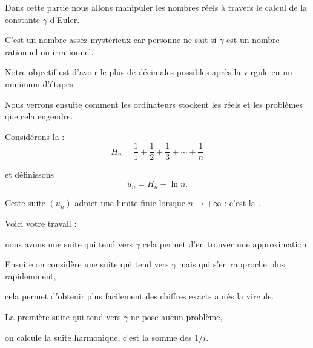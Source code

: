 


\newcommand{\codeinline}[1]{\texttt{#1}}






\debuttexte

\diapo

\change

\change


Dans cette partie nous allons manipuler les nombres réels à travers le calcul de la constante $\gamma$ d'Euler.


C'est un nombre assez mystérieux car personne ne sait si $\gamma$ est un nombre rationnel ou irrationnel.

\change

Notre objectif est d'avoir le plus de décimales possibles après la virgule en un minimum d'étapes.

\change

Nous verrons ensuite comment les ordinateurs stockent les réels et les problèmes que cela engendre.


\diapo

Considérons la  :
$$H_n = \frac{1}{1}+\frac{1}{2}+\frac{1}{3}+\cdots + \frac{1}{n}$$

\change

et définissons
$$u_n = H_n - \ln n.$$

\change

Cette suite $(u_n)$ admet une limite finie lorsque $n\to+\infty$ : c'est la .

\change
Voici votre travail :

nous avons une suite qui tend vers $\gamma$ cela permet d'en trouver une approximation.

Ensuite on considère une suite qui tend vers $\gamma$ mais qui s'en rapproche plus rapidemment,

cela permet d'obtenir plus facilement des chiffres exacts après la virgule.


\diapo

La première suite qui tend vers $\gamma$ ne pose aucun problème,

on calcule la suite harmonique, c'est la somme des $1/i$.

